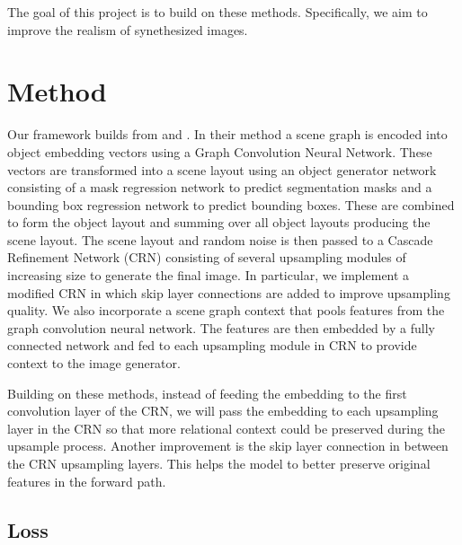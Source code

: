 \documentclass{article}
\begin{document}
The goal of this project is to build on these methods. Specifically, we aim to improve the realism of synethesized images.

\section{Method}

Our framework builds from \cite{sg2im} and \cite{sg2imgcontext}. In their method a scene graph is encoded into object embedding vectors using a Graph Convolution Neural Network. These vectors are transformed into a scene layout using an object generator network consisting of a mask regression network to predict segmentation masks and a bounding box regression network to predict bounding boxes. These are combined to form the object layout and summing over all object layouts producing the scene layout. The scene layout and random noise is then passed to a Cascade Refinement Network (CRN) \cite{crn} consisting of several upsampling modules of increasing size to generate the final image. In particular, we implement a modified CRN in which skip layer connections are added to improve upsampling quality. We also incorporate a scene graph context \cite{sg2imgcontext} that pools features from the graph convolution neural network. The features are then embedded by a fully connected network and fed to each upsampling module in CRN to provide context to the image generator.

Building on these methods, instead of feeding the embedding to the first convolution layer of the CRN, we will pass the embedding to each upsampling layer in the CRN so that more relational context could be preserved during the upsample process. Another improvement is the skip layer connection in between the CRN upsampling layers. This helps the model to better preserve original features in the forward path.

\subsection{Loss}
\end{document}
